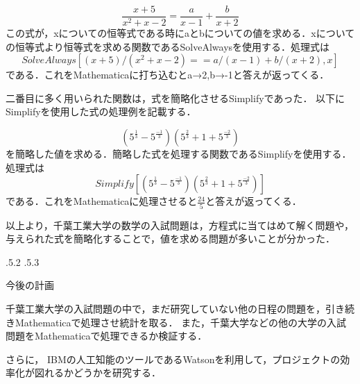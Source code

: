 \documentclass[uplatex]{jsarticle}
\makeatletter
\renewcommand{\section}{%
    \if@slide\clearpage\fi
    \@startsection{section}{1}{\z@}%
    {\Cvs \@plus.5\Cdp \@minus.2\Cdp}%
    {.5\Cvs \@plus.3\Cdp}%
    {\normalfont\raggedright}}
\makeatother
\begin{document}
\[
  \frac{x+5}{x^2 +x-2} = \frac{a}{x-1} +\frac{b}{x+2}
\]
この式が，xについての恒等式である時にaとbについての値を求める．xについての恒等式より恒等式を求める関数であるSolveAlwaysを使用する．処理式は
\[SolveAlways[(x+5)/(x^2 +x-2) ==a/(x-1) +b/(x+2) ,x] \]
である．これをMathematicaに打ち込むと{{a→2,b→-1}}と答えが返ってくる．

二番目に多く用いられた関数は，式を簡略化させるSimplifyであった．
以下にSimplifyを使用した式の処理例を記載する．

\[
(5^{\frac{1}{3}} -5^{\frac{-1}{3}} )(5^{\frac{2}{3}} +1+5^{\frac{-2}{3}} ) 
\]
を簡略した値を求める．簡略した式を処理する関数であるSimplifyを使用する．処理式は
\[Simplify[(5^{\frac{1}{3}} -5^{\frac{-1}{3}} )(5^{\frac{2}{3}} +1+5^{\frac{-2}{3}} ) ] \]
である．これをMathematicaに処理させると$\frac{24}{5}$と答えが返ってくる．

以上より，千葉工業大学の数学の入試問題は，方程式に当てはめて解く問題や，与えられた式を簡略化することで，値を求める問題が多いことが分かった．




\section{今後の計画}

千葉工業大学の入試問題の中で，まだ研究していない他の日程の問題を，引き続きMathematicaで処理させ統計を取る．
また，千葉大学などの他の大学の入試問題をMathematicaで処理できるか検証する．

さらに， IBMの人工知能のツールであるWatsonを利用して，プロジェクトの効率化が図れるかどうかを研究する．


\end{document}
